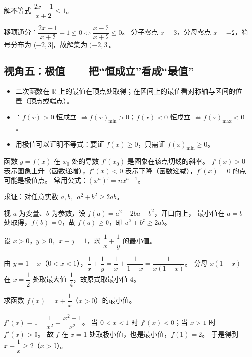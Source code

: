 \begin{explore}
\begin{problem}
解不等式 $\dfrac{2x-1}{x+2}\leq1$。
\end{problem}
\begin{solution}
移项通分：$\dfrac{2x-1}{x+2}-1\leq0\iff\dfrac{x-3}{x+2}\leq0$。
分子零点 $x=3$，分母零点 $x=-2$，符号分布为 $(-2,3]$，故解集为 $(-2,3]$。
\end{solution}

\subsection{视角五：极值——把“恒成立”看成“最值”}

\begin{itemize}
  \item 二次函数在 $\mathbb{R}$ 上的最值在顶点处取得；在区间上的最值看对称轴与区间的位置（顶点或端点）。
  \item {}：$f(x)>0$ 恒成立 $\iff f(x)_{\min}>0$；$f(x)<0$ 恒成立 $\iff f(x)_{\max}<0$。
  \item 用极值可以证明不等式：要证 $f(x)\geq0$，只需证 $f(x)_{\min}\geq0$。
\end{itemize}

函数 $y=f(x)$ 在 $x_0$ 处的导数 $f'(x_0)$ 是图象在该点切线的斜率。
$f'(x)>0$ 表示图象上升（函数递增），$f'(x)<0$ 表示下降（函数递减），$f'(x)=0$ 的点可能是极值点。
常用公式：$(x^n)'=nx^{n-1}$。

\begin{example}
求证：对任意实数 $a,b$，$a^2+b^2\geq2ab$。
\end{example}
\begin{solution}
视 $a$ 为变量、$b$ 为参数，设 $f(a)=a^2-2ba+b^2$，开口向上，
最小值在 $a=b$ 处取得，$f(b)=0$，故 $f(a)\geq0$，即 $a^2+b^2\geq2ab$。
\end{solution}

\begin{example}
设 $x>0$，$y>0$，$x+y=1$，求 $\dfrac1x+\dfrac1y$ 的最小值。
\end{example}
\begin{solution}
由 $y=1-x$（$0<x<1$），$\dfrac1x+\dfrac1y=\dfrac1x+\dfrac1{1-x}=\dfrac{1}{x(1-x)}$。
分母 $x(1-x)$ 在 $x=\dfrac12$ 处取最大值 $\dfrac14$，故原式取最小值 $4$。
\end{solution}

\begin{problem}
求函数 $f(x)=x+\dfrac1x$（$x>0$）的最小值。
\end{problem}
\begin{solution}
$f'(x)=1-\dfrac1{x^2}=\dfrac{x^2-1}{x^2}$。
当 $0<x<1$ 时 $f'(x)<0$；当 $x>1$ 时 $f'(x)>0$。
故 $f$ 在 $x=1$ 处取极小值，也是最小值，$f(1)=2$。
于是得到 $x+\dfrac1x\geq2$（$x>0$）。
\end{solution}


\end{explore}
